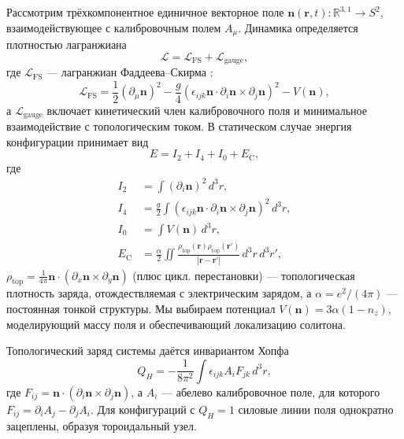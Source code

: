 \documentclass[12pt]{article}
\begin{document}
Рассмотрим трёхкомпонентное единичное векторное поле $\mathbf{n}(\mathbf{r},t): \mathbb{R}^{3,1} \to S^2$, взаимодействующее с калибровочным полем $A_\mu$. Динамика определяется плотностью лагранжиана
\begin{equation}
\mathcal{L} = \mathcal{L}_{\text{FS}} + \mathcal{L}_{\text{gauge}},
\end{equation}
где $\mathcal{L}_{\text{FS}}$ --- лагранжиан Фаддеева--Скирма \cite{Faddeev1997}:
\begin{equation}
\mathcal{L}_{\text{FS}} = \frac{1}{2} (\partial_\mu \mathbf{n})^2 - \frac{g}{4} (\epsilon_{ijk} \mathbf{n}\cdot \partial_i\mathbf{n}\times\partial_j\mathbf{n})^2 - V(\mathbf{n}),
\end{equation}
а $\mathcal{L}_{\text{gauge}}$ включает кинетический член калибровочного поля и минимальное взаимодействие с топологическим током. В статическом случае энергия конфигурации принимает вид
\begin{equation}
E = I_2 + I_4 + I_0 + E_{\text{C}},
\label{eq:E_total}
\end{equation}
где
\begin{align}
I_2 &= \int (\partial_i \mathbf{n})^2 \, d^3r, \label{eq:I2}\\
I_4 &= \frac{g}{2} \int (\epsilon_{ijk} \mathbf{n}\cdot \partial_i\mathbf{n}\times\partial_j\mathbf{n})^2 \, d^3r, \label{eq:I4}\\
I_0 &= \int V(\mathbf{n}) \, d^3r, \label{eq:I0}\\
E_{\text{C}} &= \frac{\alpha}{2} \iint \frac{\rho_{\text{top}}(\mathbf{r})\rho_{\text{top}}(\mathbf{r}')}{|\mathbf{r}-\mathbf{r}'|} \, d^3r\, d^3r', \label{eq:Ec}
\end{align}
$\rho_{\text{top}} = \frac{1}{4\pi} \mathbf{n}\cdot(\partial_x\mathbf{n}\times\partial_y\mathbf{n})$ (плюс цикл. перестановки) --- топологическая плотность заряда, отождествляемая с электрическим зарядом, а $\alpha = e^2/(4\pi)$ --- постоянная тонкой структуры. Мы выбираем потенциал $V(\mathbf{n}) = 3\alpha (1 - n_z)$, моделирующий массу поля и обеспечивающий локализацию солитона.

Топологический заряд системы даётся инвариантом Хопфа
\begin{equation}
Q_H = -\frac{1}{8\pi^2} \int \epsilon_{ijk} A_i F_{jk} \, d^3r,
\end{equation}
где $F_{ij} = \mathbf{n}\cdot(\partial_i\mathbf{n}\times\partial_j\mathbf{n})$, а $A_i$ --- абелево калибровочное поле, для которого $F_{ij} = \partial_i A_j - \partial_j A_i$. Для конфигураций с $Q_H=1$ силовые линии поля однократно зацеплены, образуя тороидальный узел.
\end{document}
